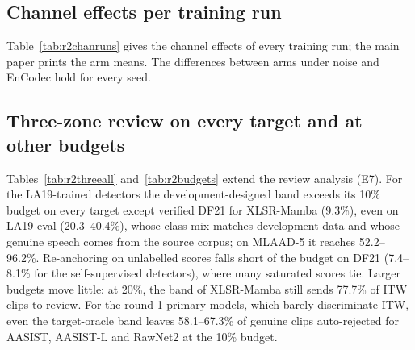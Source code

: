 \documentclass[10pt]{article}
\newcommand{\tauE}{\tau^{*}_{\mathrm{EER}}}
\newcommand{\wide}[1]{\begingroup\footnotesize\setlength{\tabcolsep}{3.5pt}\resizebox{\textwidth}{!}{}\endgroup}
\begin{document}
\begin{table}[!ht]
\caption{Untrimmed AASIST-L runs with their registered weight averages and with their last-epoch weights, and the trimmed
runs, at each run's \(\tauE\) (rates \%, TTG pp). \(^\dagger\)Pipeline check, outside the means.}
\label{tab:r2last}
\centering
\wide{r2s_last}
\end{table}

\subsection{Channel effects per training run}
Table~\ref{tab:r2chanruns} gives the channel effects of every training run; the main paper prints the arm means. The
differences between arms under noise and EnCodec hold for every seed.

\begin{table}[!ht]
\caption{Channel effects at each run's \(\tauE\): \(\Delta\)FRR/\(\Delta\)FAR (pp) against the clean copy of the 1,000-clip
set (E4).}
\label{tab:r2chanruns}
\centering
\wide{r2s_channels}
\end{table}

\subsection{Three-zone review on every target and at other budgets}
Tables~\ref{tab:r2threeall} and~\ref{tab:r2budgets} extend the review analysis (E7). For the LA19-trained detectors the
development-designed band exceeds its 10\% budget on every target except verified DF21 for XLSR-Mamba (9.3\%), even on
LA19 eval (20.3--40.4\%), whose class mix matches development data and whose genuine speech comes from the source corpus;
on MLAAD-5 it reaches 52.2--96.2\%. Re-anchoring on unlabelled scores falls short of the budget on DF21 (7.4--8.1\% for
the self-supervised detectors), where many saturated scores tie. Larger budgets move little: at 20\%, the band
of XLSR-Mamba still sends 77.7\% of ITW clips to review. For the round-1 primary models, which barely discriminate ITW,
even the target-oracle band leaves 58.1--67.3\% of genuine clips auto-rejected for AASIST, AASIST-L and RawNet2 at the
10\% budget.
\end{document}
